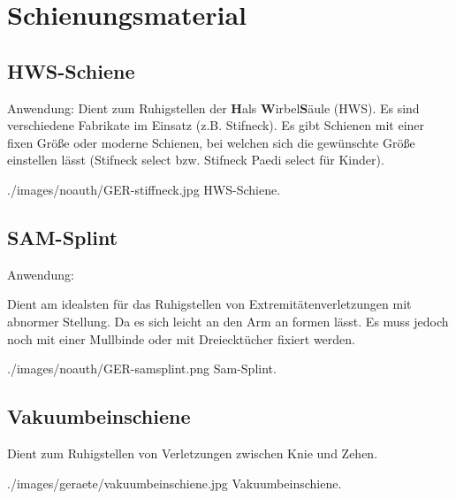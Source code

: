    
\clearpage
\section{Schienungsmaterial}

\subsection{HWS-Schiene}
\label{topic:hws-schiene-beschreibung}

Anwendung: 
{
Dient zum Ruhigstellen der {\bfseries H}als{\bfseries
W}irbel{\bfseries S}äule (HWS). Es sind verschiedene
Fabrikate im Einsatz (z.B. Stifneck\texttrademark). Es gibt
Schienen mit einer fixen Größe oder moderne Schienen, bei
welchen sich die gewünschte Größe einstellen lässt
(Stifneck select{\texttrademark} bzw. Stifneck Paedi
select{\texttrademark} für Kinder).
}{

}
{./images/noauth/GER-stiffneck.jpg}
{HWS-Schiene.}
{}




\subsection{SAM-Splint}

\label{topic:sam-splint-beschreibung}

Anwendung: 

{
Dient am idealsten für das Ruhigstellen von Extremitätenverletzungen mit abnormer Stellung. Da es sich leicht an den
Arm an formen lässt. Es muss jedoch noch mit einer Mullbinde
oder mit Dreiecktücher fixiert werden.
}{

}
{./images/noauth/GER-samsplint.png}
{Sam-Splint.}
{}


\subsection{Vakuumbeinschiene}
\label{topic:vacuumbeinschiene-beschreibung}

{
Dient zum Ruhigstellen von Verletzungen zwischen Knie und Zehen.
}{

}
{./images/geraete/vakuumbeinschiene.jpg}
{\gAuthNotesPicLegalOk{}{}Vakuumbeinschiene.}
{}





